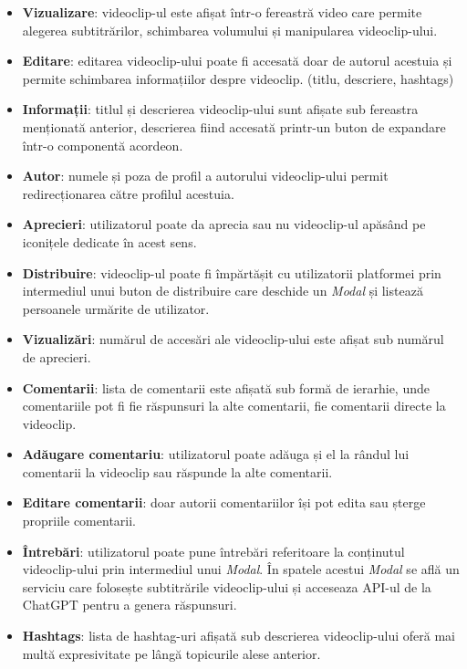 \begin{itemize}
    \item \textbf{Vizualizare}: videoclip-ul este afișat într-o fereastră video care
    permite alegerea subtitrărilor, schimbarea volumului și manipularea videoclip-ului.
    \item \textbf{Editare}: editarea videoclip-ului poate fi accesată doar de autorul acestuia
    și permite schimbarea informațiilor despre videoclip. (titlu, descriere, hashtags)
    \item \textbf{Informații}: titlul și descrierea videoclip-ului sunt afișate sub fereastra
    menționată anterior, descrierea fiind accesată printr-un buton de expandare într-o componentă
    acordeon.
    \item \textbf{Autor}: numele și poza de profil a autorului videoclip-ului permit
    redirecționarea către profilul acestuia.
    \item \textbf{Aprecieri}: utilizatorul poate da aprecia sau nu videoclip-ul apăsând pe
    iconițele dedicate în acest sens.
    \item \textbf{Distribuire}: videoclip-ul poate fi împărtășit cu utilizatorii platformei
    prin intermediul unui buton de distribuire care deschide un \textit{Modal} și listează
    persoanele urmărite de utilizator.
    \item \textbf{Vizualizări}: numărul de accesări ale videoclip-ului este afișat sub numărul
    de aprecieri.
    \item \textbf{Comentarii}: lista de comentarii este afișată sub formă de ierarhie, unde
    comentariile pot fi fie răspunsuri la alte comentarii, fie comentarii directe la videoclip.
    \item \textbf{Adăugare comentariu}: utilizatorul poate adăuga și el la rândul lui comentarii la videoclip
    sau răspunde la alte comentarii.
    \item \textbf{Editare comentarii}: doar autorii comentariilor își pot edita sau șterge propriile comentarii.
    \item \textbf{Întrebări}: utilizatorul poate pune întrebări referitoare la conținutul videoclip-ului
    prin intermediul unui \textit{Modal}. În spatele acestui \textit{Modal} se află un serviciu care
    folosește subtitrările videoclip-ului și acceseaza API-ul de la ChatGPT pentru a genera răspunsuri.
    \item \textbf{Hashtags}: lista de hashtag-uri afișată sub descrierea videoclip-ului oferă mai
    multă expresivitate pe lângă topicurile alese anterior.
\end{itemize}

